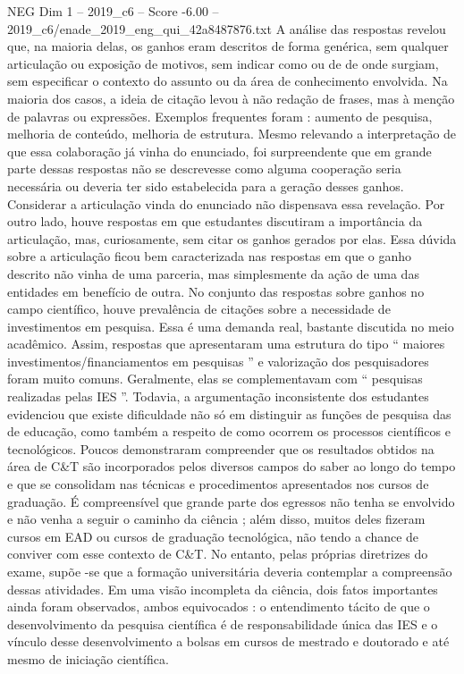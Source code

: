 \begin{textsample}{NEG Dim 1 – 2019\_c6 – Score -6.00 – 2019\_c6/enade\_2019\_eng\_qui\_42a8487876.txt}
A análise das respostas revelou que, na maioria delas, os ganhos eram descritos de forma genérica, sem qualquer articulação ou exposição de motivos, sem indicar como ou de de onde surgiam, sem especificar o contexto do assunto ou da área de conhecimento envolvida.
Na maioria dos casos, a ideia de citação levou à não redação de frases, mas à menção de palavras ou expressões.
Exemplos frequentes foram : aumento de pesquisa, melhoria de conteúdo, melhoria de estrutura.
Mesmo relevando a interpretação de que essa colaboração já vinha do enunciado, foi surpreendente que em grande parte dessas respostas não se descrevesse como alguma cooperação seria necessária ou deveria ter sido estabelecida para a geração desses ganhos.
Considerar a articulação vinda do enunciado não dispensava essa revelação.
Por outro lado, houve respostas em que estudantes discutiram a importância da articulação, mas, curiosamente, sem citar os ganhos gerados por elas.
Essa dúvida sobre a articulação ficou bem caracterizada nas respostas em que o ganho descrito não vinha de uma parceria, mas simplesmente da ação de uma das entidades em benefício de outra.
No conjunto das respostas sobre ganhos no campo científico, houve prevalência de citações sobre a necessidade de investimentos em pesquisa.
Essa é uma demanda real, bastante discutida no meio acadêmico.
Assim, respostas que apresentaram uma estrutura do tipo “ maiores investimentos/financiamentos em pesquisas ” e valorização dos pesquisadores foram muito comuns.
Geralmente, elas se complementavam com “ pesquisas realizadas pelas IES ”.
Todavia, a argumentação inconsistente dos estudantes evidenciou que existe dificuldade não só em distinguir as funções de pesquisa das de educação, como também a respeito de como ocorrem os processos científicos e tecnológicos.
Poucos demonstraram compreender que os resultados obtidos na área de C\&T são incorporados pelos diversos campos do saber ao longo do tempo e que se consolidam nas técnicas e procedimentos apresentados nos cursos de graduação.
É compreensível que grande parte dos egressos não tenha se envolvido e não venha a seguir o caminho da ciência ; além disso, muitos deles fizeram cursos em EAD ou cursos de graduação tecnológica, não tendo a chance de conviver com esse contexto de C\&T.
No entanto, pelas próprias diretrizes do exame, supõe -se que a formação universitária deveria contemplar a compreensão dessas atividades.
Em uma visão incompleta da ciência, dois fatos importantes ainda foram observados, ambos equivocados : o entendimento tácito de que o desenvolvimento da pesquisa científica é de responsabilidade única das IES e o vínculo desse desenvolvimento a bolsas em cursos de mestrado e doutorado e até mesmo de iniciação científica.

\end{textsample}
